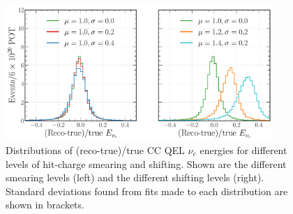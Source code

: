 \begin{table} %
     \caption[Classification performance metrics for different levels of hit-charge smearing and
    shifting] {Classification performance metrics for different levels of hit-charge smearing and
    shifting. The highest scoring values for each metric are indicated in bold.}
    \label{tab:calib_charge}
\end{table}

\begin{figure} %
    \includegraphics[width=0.9\textwidth]{diagrams/7-results/calib_charge_energy.pdf}
    \caption[Distributions of (reco-true)/true $\nu_{e}$ energies for different levels of
        hit-charge smearing and shifting] {Distributions of (reco-true)/true CC QEL $\nu_{e}$
        energies for different levels of hit-charge smearing and shifting. Shown are the different
        smearing levels (left) and the different shifting levels (right). Standard deviations
        found from fits made to each distribution are shown in brackets.}
    \label{fig:calib_charge_energy}
\end{figure}

